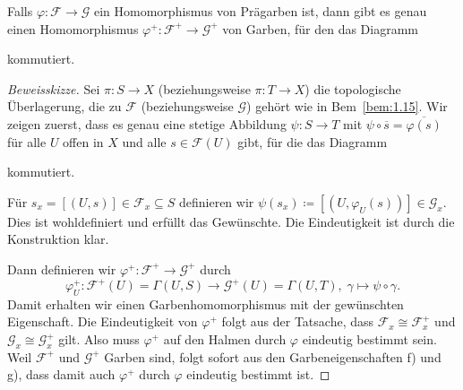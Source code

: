 \begin{prop}
\label{prop:1.17}
	Falls $\varphi \colon \mathcal{F} \to \mathcal{G}$ ein Homomorphismus von Prägarben ist, dann gibt es genau einen Homomorphismus $\varphi^+\colon\mathcal{F}^+\to \mathcal{G}^+$ von Garben, für den das Diagramm
	\begin{center}
	\end{center}
	kommutiert.
	\begin{proof}[Beweisskizze]
		Sei $\pi\colon S \to X$ (beziehungsweise $\pi\colon T \to X$) die topologische Überlagerung, die zu $\mathcal{F}$ (beziehungsweise $\mathcal{G}$) gehört wie in Bem~\ref{bem:1.15}. Wir zeigen zuerst, dass es genau eine stetige Abbildung $\psi \colon S \to T$ mit $\psi \circ \overline{s} = \overline{\varphi(s)}$ für alle $U$ offen in $X$ und alle $s \in \mathcal{F}(U)$ gibt, für die das Diagramm
		\begin{center}
		\end{center}
		kommutiert.

		Für $s_x = [(U,s)] \in \mathcal{F}_x \subseteq S$ definieren wir $\psi(s_x) \coloneqq [(U,\varphi_U(s))] \in \mathcal{G}_x$. Dies ist wohldefiniert und erfüllt das Gewünschte. Die Eindeutigkeit ist durch die Konstruktion klar.

		Dann definieren wir $\varphi^+\colon\mathcal{F}^+\to\mathcal{G}^+$ durch
		\[
			\varphi_U^+\colon \mathcal{F}^+(U) = \Gamma(U,S) \to \mathcal{G}^+(U) = \Gamma(U,T),\; \gamma \mapsto \psi \circ \gamma.
		\]
		Damit erhalten wir einen Garbenhomomorphismus mit der gewünschten Eigenschaft. Die Eindeutigkeit von $\varphi^+$ folgt aus der Tatsache, dass $\mathcal{F}_x \cong \mathcal{F}^+_x$ und $\mathcal{G}_x \cong \mathcal{G}^+_x$ gilt. Also muss $\varphi^+$ auf den Halmen durch $\varphi$ eindeutig bestimmt sein. Weil $\mathcal{F}^+$ und $\mathcal{G}^+$ Garben sind, folgt sofort aus den Garbeneigenschaften f) und g), dass damit auch $\varphi^+$ durch $\varphi$ eindeutig bestimmt ist.
	\end{proof}
\end{prop}

